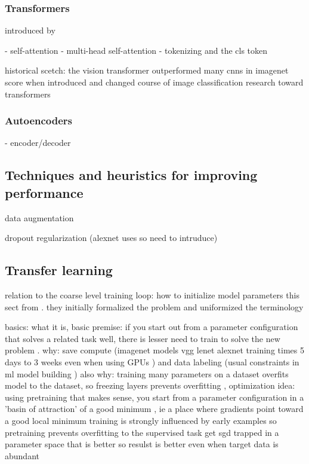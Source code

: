 \documentclass{article}
\begin{document}
\subsubsection{Transformers}


introduced by \cite{attention_is_all_you_need}

- self-attention
- multi-head self-attention
- tokenizing and the cls token

historical scetch: the vision transformer \cite{vit} outperformed many cnns in imagenet score when introduced and changed 
course of image classification research toward transformers

\subsubsection{Autoencoders}

- encoder/decoder

\subsection{Techniques and heuristics for improving performance}

data augmentation

dropout regularization (alexnet uses so need to intruduce)

\subsection{Transfer learning}

relation to the coarse level training loop: how to initialize model parameters
this sect from \cite{transferlearning_survey}. they initially formalized the problem and uniformized 
the terminology

basics: what it is, basic premise: if you start out from a parameter configuration that solves a related 
task well, there is lesser need to train to solve the new problem \cite{transferlearning_survey}.
why: save compute (imagenet models vgg lenet alexnet training times 5 days to 3 weeks even when using GPUs \cite{vgg}) and data labeling (usual constraints in ml model building \cite{engbook})
also why: training many parameters on a dataset overfits model to the dataset, so freezing layers prevents overfitting \cite{googlelenet},
optimization idea: using pretraining that makes sense, you start from a parameter configuration in a 'basin of attraction'
of a good minimum \cite{erhanWhyDoesUnsupervised2010}, ie a place where gradients point toward a good local minimum
    training is strongly influenced by early examples so pretraining prevents overfitting to the supervised task 
    get sgd trapped in a parameter space that is better so resulst is better even when target data is abundant \cite{erhanWhyDoesUnsupervised2010}    
\end{document}
